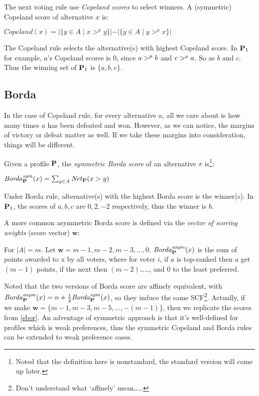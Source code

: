 The next voting rule use \textit{Copeland scores} to select winners. A (symmetric) Copeland score of alternative $x$ is:
\begin{definition}
    $\mathit{Copeland}(x) = |\{y \in A\;|\; x >^\mu y\}| - |\{y \in A\;|\; y >^\mu x\}|$
\end{definition}

The Copeland rule selects the alternative(s) with highest Copeland score. In $\mathbf{P}_1$ for example, $a$'s Copeland scores is $0$, since $a >^\mu b$ and $c >^\mu a$. So as $b \mbox{ and } c$. Thus the winning set of $\mathbf{P}_1$ is $\{a,b,c\}$.

\subsection{Borda}

In the case of Copeland rule, for every alternative $a$, all we care about is how many times $a$ has been defeated and won. However, as we can notice, the margins of victory or defeat matter as well. If we take these margins into consideration, things will be different.

Given a profile $\mathbf{P}$, the \textit{symmetric Borda score} of an alternative $x$ is\footnote{Noted that the definition here is nonstandard, the standard version will come up later.}:
\begin{definition}
    \label{sbor}
    $\mathit{Borda}^{\mathit{sym}}_{\mathbf{P}} (x) = \sum_{y \in A} \mathit{Net}_{\mathbf{P}} (x > y)$
\end{definition}

Under Borda rule, alternative(s) with the highest Borda score is the winner(s). In $\mathbf{P}_1$, the scores of $a,b,c$ are $0,2,-2$ respectively, thus the winner is $b$.

A more common asymmetric Borda score is defined via the \textit{vector of scoring weights} (score vector) $\mathbf{w}$:

\begin{definition}
    For $|A| = m$. Let $\mathbf{w} = {m-1,m-2,m-3,\dots,0}$. $\mathit{Borda}^{\mathit{asym}}_{\mathbf{P}} (x)$ is the sum of points awarded to x by all voters, where for voter $i$, if $a$ is top-ranked then $a$ get $(m-1)$ points, if the next then $(m-2)$\dots\dots, and $0$ to the least preferred.
\end{definition}

Noted that the two versions of Borda score are affinely equivalent, with $\mathit{Borda}^{\mathit{asym}}_{\mathbf{P}} (x) = n + \frac{1}{2} \mathit{Borda}^{\mathit{sym}}_{\mathbf{P}} (x)$, so they induce the same SCF\footnote{Don't understand what `affinely' mean\dots\dots}. Actually, if we make $\mathbf{w} = \{m-1,m-3,m-5,\dots,-(m-1)\}$, then we replicate the scores from \cref{sbor}. An adventage of symmetric approach is that it's well-defined for profiles which is weak preferences, thus the symmetric Copeland and Borda rules can be extended to weak preference cases.

